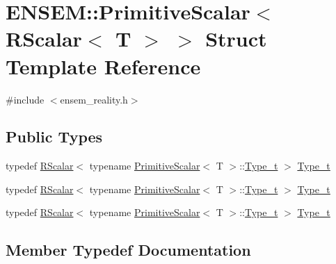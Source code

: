 \hypertarget{structENSEM_1_1PrimitiveScalar_3_01RScalar_3_01T_01_4_01_4}{}\section{E\+N\+S\+EM\+:\+:Primitive\+Scalar$<$ R\+Scalar$<$ T $>$ $>$ Struct Template Reference}
\label{structENSEM_1_1PrimitiveScalar_3_01RScalar_3_01T_01_4_01_4}


{\ttfamily \#include $<$ensem\+\_\+reality.\+h$>$}

\subsection*{Public Types}
\begin{DoxyCompactItemize}
\item 
typedef \mbox{\hyperlink{classENSEM_1_1RScalar}{R\+Scalar}}$<$ typename \mbox{\hyperlink{structENSEM_1_1PrimitiveScalar}{Primitive\+Scalar}}$<$ T $>$\+::\mbox{\hyperlink{structENSEM_1_1PrimitiveScalar_3_01RScalar_3_01T_01_4_01_4_af25173576e04e62938a35f7747631b4f}{Type\+\_\+t}} $>$ \mbox{\hyperlink{structENSEM_1_1PrimitiveScalar_3_01RScalar_3_01T_01_4_01_4_af25173576e04e62938a35f7747631b4f}{Type\+\_\+t}}
\item 
typedef \mbox{\hyperlink{classENSEM_1_1RScalar}{R\+Scalar}}$<$ typename \mbox{\hyperlink{structENSEM_1_1PrimitiveScalar}{Primitive\+Scalar}}$<$ T $>$\+::\mbox{\hyperlink{structENSEM_1_1PrimitiveScalar_3_01RScalar_3_01T_01_4_01_4_af25173576e04e62938a35f7747631b4f}{Type\+\_\+t}} $>$ \mbox{\hyperlink{structENSEM_1_1PrimitiveScalar_3_01RScalar_3_01T_01_4_01_4_af25173576e04e62938a35f7747631b4f}{Type\+\_\+t}}
\item 
typedef \mbox{\hyperlink{classENSEM_1_1RScalar}{R\+Scalar}}$<$ typename \mbox{\hyperlink{structENSEM_1_1PrimitiveScalar}{Primitive\+Scalar}}$<$ T $>$\+::\mbox{\hyperlink{structENSEM_1_1PrimitiveScalar_3_01RScalar_3_01T_01_4_01_4_af25173576e04e62938a35f7747631b4f}{Type\+\_\+t}} $>$ \mbox{\hyperlink{structENSEM_1_1PrimitiveScalar_3_01RScalar_3_01T_01_4_01_4_af25173576e04e62938a35f7747631b4f}{Type\+\_\+t}}
\end{DoxyCompactItemize}


\subsection{Member Typedef Documentation}
\mbox{\label{structENSEM_1_1PrimitiveScalar_3_01RScalar_3_01T_01_4_01_4_af25173576e04e62938a35f7747631b4f}} 
